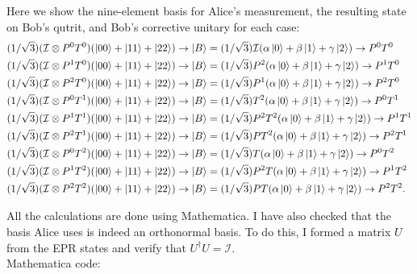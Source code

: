 \documentclass{article}
\theoremstyle{definition}
\newcommand{\al}{\alpha}
\newcommand{\be}{\beta}
\newcommand{\Id}{\mathcal{I}}
\begin{document}
\noindent Here we show the nine-element basis for Alice's measurement, the resulting state on Bob's qutrit, and Bob's corrective unitary for each case:
\begin{align*}
	(1/\sqrt{3})(\Id \otimes P^0 T^0)(\ket{00} + \ket{11} + \ket{22}) &\to \ket{B} = (1/\sqrt{3})\Id(\al\ket{0} + \be\ket{1} + \gamma\ket{2}) \to P^0T^0 \\
	(1/\sqrt{3})(\Id \otimes P^1 T^0)(\ket{00} + \ket{11} + \ket{22}) &\to \ket{B} = (1/\sqrt{3}) P^2(\al\ket{0} + \be\ket{1} + \gamma\ket{2}) \to P^1 T^0\\
	(1/\sqrt{3})(\Id \otimes P^2 T^0)(\ket{00} + \ket{11} + \ket{22}) &\to \ket{B} = (1/\sqrt{3})P^1(\al\ket{0} + \be\ket{1} + \gamma\ket{2}) \to P^2 T^0\\
	(1/\sqrt{3})(\Id \otimes P^0 T^1)(\ket{00} + \ket{11} + \ket{22}) &\to \ket{B} = (1/\sqrt{3})T^2(\al\ket{0} + \be\ket{1} + \gamma\ket{2}) \to P^0 T^1\\
	(1/\sqrt{3})(\Id \otimes P^1 T^1)(\ket{00} + \ket{11} + \ket{22}) &\to \ket{B} = (1/\sqrt{3})P^2  T^2(\al\ket{0} + \be\ket{1} + \gamma\ket{2}) \to P^1T^1\\
	(1/\sqrt{3})(\Id \otimes P^2 T^1)(\ket{00} + \ket{11} + \ket{22}) &\to \ket{B} = (1/\sqrt{3}) P T^2(\al\ket{0} + \be\ket{1} + \gamma\ket{2}) \to P^2 T^1\\
	(1/\sqrt{3})(\Id \otimes P^0 T^2)(\ket{00} + \ket{11} + \ket{22}) &\to \ket{B} = (1/\sqrt{3}) T(\al\ket{0} + \be\ket{1} + \gamma\ket{2}) \to P^0 T^2\\
	(1/\sqrt{3})(\Id \otimes P^1 T^2)(\ket{00} + \ket{11} + \ket{22}) &\to \ket{B} = (1/\sqrt{3}) P^2 T (\al\ket{0} + \be\ket{1} + \gamma\ket{2}) \to P^1 T^2\\
	(1/\sqrt{3})(\Id \otimes P^2 T^2)(\ket{00} + \ket{11} + \ket{22}) &\to \ket{B} = (1/\sqrt{3}) P T(\al\ket{0} + \be\ket{1} + \gamma\ket{2}) \to P^2 T^2.
\end{align*}

\noindent All the calculations are done using Mathematica. I have also checked that the basis Alice uses is indeed an orthonormal basis. To do this, I formed a matrix $U$ from the EPR states and verify that $U^\dagger U = \Id$.\\

\noindent Mathematica code:
\end{document}
